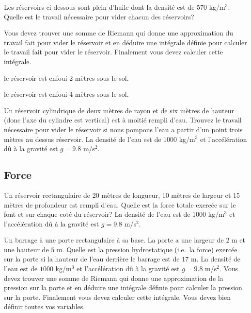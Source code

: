 \begin{question}[\eng]
Les réservoirs ci-dessous sont plein d'huile dont la densité est de
570 kg/m$^3$.  Quelle est le travail nécessaire pour vider chacun des
réservoirs? 

Vous devez trouver une somme de Riemann qui donne une approximation du
travail fait pour vider le réservoir et en déduire une intégrale
définie pour calculer le travail fait pour vider le
réservoir. Finalement vous devez calculer cette intégrale. 

 le réservoir est enfoui 2 mètres sous le sol.

 le réservoir est enfoui 4 mètres sous le sol.
\label{8Q24}
\end{question}

\begin{question}[\eng]
Un réservoir cylindrique de deux mètres de rayon et de six mètres de
hauteur (donc l'axe du cylindre est vertical) est à moitié rempli
d'eau.  Trouvez le travail nécessaire pour vider le réservoir si nous
pompons l'eau a partir d'un point trois mètres au dessus réservoir.  La
densité de l'eau est de $1000$ kg/m$^3$ et l'accélération dû à la
gravité est $g=9.8$ m/s$^2$.
\label{8Q25}
\end{question}

\subsection{Force}

\begin{question}[\eng]
Un réservoir rectangulaire de 20 mètres de longueur, 10
mètres de largeur et 15 mètres de profondeur est rempli d'eau.  Quelle
est la force totale exercée sur le font et sur chaque coté du
réservoir?  La densité de l'eau est de $1000$ kg/m$^3$ et
l'accélération dû à la gravité est $g=9.8$ m/s$^2$.
\label{8Q26}
\end{question}

\begin{question}[\eng]
Un barrage à une porte rectangulaire à sa base.  La porte a une largeur
de $2$ m et une hauteur de $5$ m.  Quelle est la pression
hydrostatique (i.e.\ la force) exercée sur la porte si la hauteur de
l'eau derrière le barrage est de $17$ m.  La densité de l'eau est de
$1000$ kg/m$^3$ et l'accélération dû à la gravité est $g=9.8$
m/s$^2$.
Vous devez trouver une somme de Riemann qui donne une approximation de
la pression sur la porte et en déduire une intégrale définie pour
calculer la pression sur la porte. Finalement vous devez calculer
cette intégrale. Vous devez bien définir toutes vos variables.
\label{8Q27}
\end{question}

